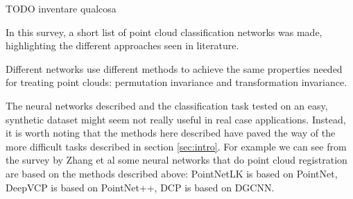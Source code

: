 TODO inventare qualcosa

In this survey, a short list of point cloud classification networks was made, highlighting the different approaches seen in literature.

Different networks use different methods to achieve the same properties needed for treating point clouds: permutation invariance and transformation invariance.


The neural networks described and the classification task tested on an easy, synthetic dataset might seem not really useful in real case applications. Instead, it is worth noting that the methods here described have paved the way of the more difficult tasks described in section \ref{sec:intro}.
For example we can see from the survey by Zhang et al \cite{ZHANG2020222} some neural networks that do point cloud registration are based on the methods described above: PointNetLK \cite{pointnetlk} is based on PointNet, DeepVCP \cite{deepvcp} is based on PointNet++, DCP\cite{dcp} is based on DGCNN.